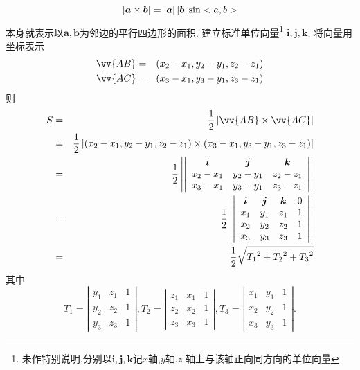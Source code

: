 $$\left| {\bm{a}\times\bm{b}} \right|=\left| {\bm{a}} \right|\left| {\bm{b}} \right|\sin<a,b>$$
本身就表示以$\bm{a},\bm{b}$为邻边的平行四边形的面积.
建立标准单位向量\footnote{
  未作特别说明,分别以$\bm{i},\bm{j},\bm{k}$记$x$轴,$y$轴,$z$
  轴上与该轴正向同方向的单位向量
  }
  $\bm{i},\bm{j},\bm{k}$, 将向量用坐标表示
\begin{eqnarray}
\vv{AB}&=&(x_2-x_1,y_2-y_1,z_2-z_1)\nonumber\\
\vv{AC}&=&(x_3-x_1,y_3-y_1,z_3-z_1)\nonumber
\end{eqnarray}
则
\begin{eqnarray}
  S&=&\frac{1}{2}\abs{\vv{AB}\times\vv{AC}}\nonumber\\
  &=&\frac{1}{2}\abs
  {(x_2-x_1,y_2-y_1,z_2-z_1)\times
  (x_3-x_1,y_3-y_1,z_3-z_1)}\nonumber\\
  &=&\frac{1}{2}\left|\left|
  \begin{array}{ccc}
    \bm{i} & \bm{j} & \bm{k} \\
    x_2-x_1 & y_2-y_1  & z_2-z_1 \\
    x_3-x_1 &y_3-y_1  & z_3-z_1 \\
  \end{array}
  \right|\right|\nonumber\\
  &=&\frac{1}{2}\left|\left|
  \begin{array}{cccc}
    \bm{i}&\bm{j}&\bm{k}&0\\
    x_1&y_1&z_1&1\\
    x_2&y_2 &z_2&1\\
    x_3&y_3&z_3&1\\
  \end{array}
  \right|\right|\nonumber\\
  &=&\frac{1}{2}\sqrt
  {
    {T_1}^2+
    {T_2}^2+
    {T_3}^2
  }\nonumber
\end{eqnarray}
其中
$$
T_1=\left|\begin{array}{ccc}
          y_1&z_1&1\\
          y_2&z_2&1\\
          y_3&z_3&1
          \end{array}\right|,
T_2=\left|\begin{array}{ccc}
  z_1&x_1&1\\
  z_2&x_2&1\\
  z_3&x_3&1
  \end{array}\right|,
T_3=\left|\begin{array}{ccc}
  x_1&y_1&1\\
  x_2&y_2&1\\
  x_3&y_3&1
  \end{array}\right|.
$$
\solend

